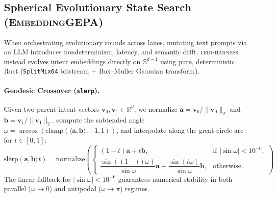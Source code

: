 \documentclass[11pt]{article}
\begin{document}
\subsection{Spherical Evolutionary State Search (\textsc{EmbeddingGEPA})}
\label{sec:gepa}

When orchestrating evolutionary rounds across lanes, mutating text prompts via an LLM introduces nondeterminism, latency, and semantic drift. \textsc{leio-harness} instead evolves intent embeddings directly on $\mathbb{S}^{d-1}$ using pure, deterministic Rust (\texttt{SplitMix64} bitstream + Box--Muller Gaussian transform).

\paragraph{Geodesic Crossover (\texttt{slerp}).}
Given two parent intent vectors $\mathbf{v}_0, \mathbf{v}_1 \in \mathbb{R}^d$, we normalize $\mathbf{a} = \mathbf{v}_0 / \|\mathbf{v}_0\|_2$ and $\mathbf{b} = \mathbf{v}_1 / \|\mathbf{v}_1\|_2$, compute the subtended angle $\omega = \arccos(\text{clamp}(\langle \mathbf{a}, \mathbf{b}\rangle, -1, 1))$, and interpolate along the great-circle arc for $t \in [0, 1]$:
\begin{equation}
\label{eq:slerp}
\text{slerp}(\mathbf{a}, \mathbf{b}; t) = \text{normalize}\!\left(
\begin{cases}
(1 - t)\mathbf{a} + t\mathbf{b}, & \text{if } |\sin\omega| < 10^{-6}, \\[6pt]
\dfrac{\sin((1 - t)\omega)}{\sin\omega}\mathbf{a} + \dfrac{\sin(t\omega)}{\sin\omega}\mathbf{b}, & \text{otherwise.}
\end{cases}
\right)
\end{equation}
The linear fallback for $|\sin\omega| < 10^{-6}$ guarantees numerical stability in both parallel ($\omega \to 0$) and antipodal ($\omega \to \pi$) regimes.
\end{document}
